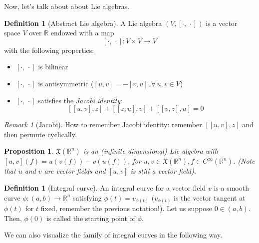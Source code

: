 \documentclass[a4paper,11pt,titlepage, article, oneside]{memoir}
\numberwithin{equation}{section}
\newtheorem{proposition}[theorem]{Proposition}
\theoremstyle{definition}
\newtheorem{definition}[theorem]{Definition}
\theoremstyle{remark}
\newtheorem{remark}[theorem]{Remark}
\newcommand{\rfield}{\mathbb{R}}
\begin{document}
Now, let's talk about about Lie algebras.

\begin{definition}[Abstract Lie algebra]
  A Lie algebra $(V, [\cdot, \, \cdot])$ is a vector space $V$ over $\rfield$ endowed with a map
  $$[\cdot , \, \cdot] \colon V \times V \rightarrow V$$
  with the following properties:
  \begin{itemize}
    \item $[\cdot , \, \cdot]$ is bilinear
    \item $[\cdot , \, \cdot]$ is antisymmetric ($[u, v] = -[v, u], \forall \, u, v \in V$)
    \item $[\cdot , \, \cdot]$ satisfies the \textit{Jacobi identity}:
    $$[[u, v], z] + [[z, u], v] + [[v, z], u] = 0$$
  \end{itemize}
\end{definition}

\begin{remarkbox}\begin{remark}[Jacobi]
  How to remember Jacobi identity: remember $[[u, v], z]$ and then  permute cyclically.
\end{remark}\end{remarkbox}

\begin{proposition}
  $\mathfrak{X}(\rfield^n)$ is an (infinite dimensional) Lie algebra with $[u, v](f) = u(v(f)) - v(u(f))$, for $u, v \in \mathfrak{X}(\rfield^n), f \in C^\infty(\rfield^n)$. (Note that $u$ and $v$ are vector fields and $[u, v]$ is still a vector field).
\end{proposition}

\begin{definition}[Integral curve]
  An integral curve for a vector field $v$ is a smooth curve $\phi \colon (a, b) \rightarrow \rfield^n$ satisfying $\dot\phi(t) = v_{\phi(t)}$ ($v_{\phi(t)}$ is the vector tangent at $\phi(t)$ for $t$ fixed, remember the previous notation!). Let us suppose $0 \in (a, b)$. Then, $\phi(0)$ is called the starting point of $\phi$.
\end{definition}

We can also visualize the family of integral curves in the following way.
\end{document}
